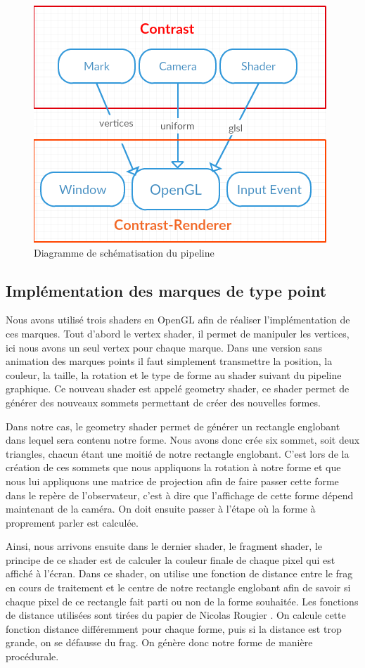 \documentclass[12pt]{article}
\begin{document}
\begin{figure}[htp]
  \centering
  \includegraphics[scale=0.8]{images/archi}
  \caption{Diagramme de schématisation du pipeline}
  \label{fig:pipe}
\end{figure}

\subsection{Implémentation des marques de type point}

Nous avons utilisé trois shaders en OpenGL afin de réaliser l'implémentation de ces marques. Tout d'abord le vertex shader, il
permet de manipuler les vertices, ici nous avons un seul vertex pour chaque marque. Dans une version sans animation des marques
points il faut simplement transmettre la position, la couleur, la taille, la rotation et le type de forme au shader suivant du
pipeline graphique. Ce nouveau shader est appelé geometry shader, ce shader permet de générer des nouveaux sommets permettant
de créer des nouvelles formes.

Dans notre cas, le geometry shader permet de générer un rectangle englobant dans lequel sera contenu notre forme. Nous avons
donc crée six sommet, soit deux triangles, chacun étant une moitié de notre rectangle englobant. C'est lors de la création de
ces sommets que nous appliquons la rotation à notre forme et que nous lui appliquons une matrice de projection afin de faire
passer cette forme dans le repère de l'observateur, c'est à dire que l'affichage de cette forme dépend maintenant de la caméra.
On doit ensuite passer à l'étape où la forme à proprement parler est calculée.

Ainsi, nous arrivons ensuite dans le dernier shader, le fragment shader, le principe de ce shader est de calculer la couleur
finale de chaque pixel qui est affiché à l'écran. Dans ce shader, on utilise une fonction de distance entre le \gls{frag} en
cours de traitement et le centre de notre rectangle englobant afin de savoir si chaque pixel de ce rectangle fait parti ou non
de la forme souhaitée. Les fonctions de distance utilisées sont tirées du papier de Nicolas Rougier \cite{Rougier}. On calcule
cette fonction distance différemment pour chaque forme, puis si la distance est trop grande, on se défausse du \gls{frag}. On
génère donc notre forme de manière procédurale.
\end{document}
